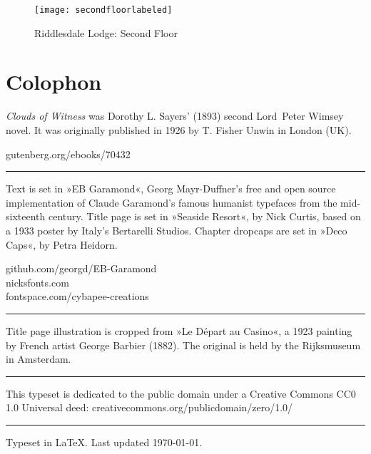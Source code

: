 \documentclass[
a5paper,
]{scrbook} %
\begin{document}
\clearpage

\begin{sidewaysfigure}
\centering
\texttt{[image: secondfloorlabeled]}%
\caption{Riddlesdale Lodge: Second Floor}
\end{sidewaysfigure}


\mainmatter
\pagestyle{headings}
\renewcommand*{\chapterpagestyle}{plain}





















\renewcommand*{\chapterheadendvskip}{\vspace{10pt}}
\renewcommand*{\chapterheadstartvskip}{\vspace{0pt}}

\clearpage
{}
\chapter*{Colophon}
\centering
\begin{minipage}{\textwidth}
\textit{Clouds of Witness} was Dorothy L. Sayers' (1893) second Lord~Peter Wimsey novel. It was originally published in 1926 by T. Fisher Unwin in London (UK).
\end{minipage}
\vfill
gutenberg.org/ebooks/70432
\vfill
\rule{0.5\textwidth}{.4pt}
\vfill
\begin{minipage}{\textwidth}
Text is set in »EB Garamond«, Georg Mayr-Duffner's free and open source implementation of Claude Garamond’s famous humanist typefaces from the mid-sixteenth century. Title page is set in »Seaside Resort«, by Nick Curtis, based on a 1933 poster by Italy’s Bertarelli Studios. Chapter dropcaps are set in »Deco Caps«, by Petra Heidorn.
\end{minipage}
\vfill
github.com/georgd/EB-Garamond\\
nicksfonts.com\\
fontspace.com/cybapee-creations
\vfill
\rule{0.5\textwidth}{.4pt}
\vfill
\begin{minipage}{\textwidth}
Title page illustration is cropped from »Le Départ au Casino«, a 1923 painting by French artist George Barbier (1882). The original is held by the Rijksmuseum in Amsterdam.
\end{minipage}
\vfill
\rule{0.5\textwidth}{.4pt}
\vfill
\begin{minipage}{\textwidth}
This typeset is dedicated to the public domain under a Creative Commons CC0 1.0 Universal deed: creativecommons.org/publicdomain/zero/1.0/
\end{minipage}
\vfill
\rule{0.5\textwidth}{.4pt}
\vfill
Typeset in \LaTeX{}. Last updated \today.

\thispagestyle{empty}
\end{document}
